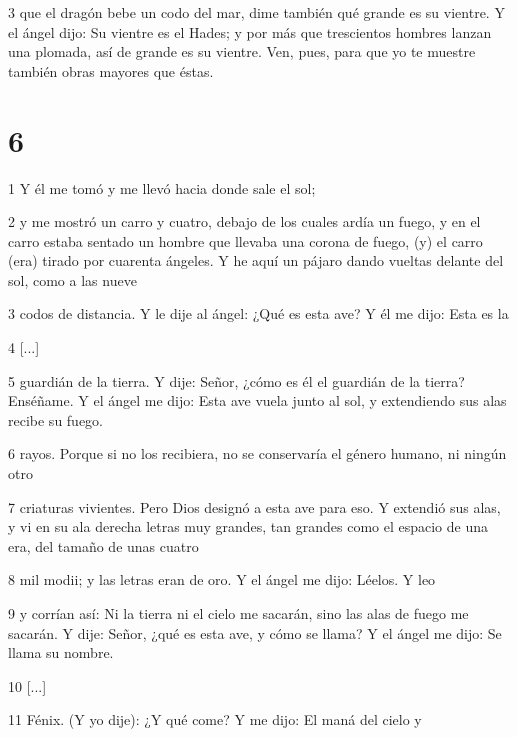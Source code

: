 \par 3 que el dragón bebe un codo del mar, dime también qué grande es su vientre. Y el ángel dijo: Su vientre es el Hades; y por más que trescientos hombres lanzan una plomada, así de grande es su vientre. Ven, pues, para que yo te muestre también obras mayores que éstas.

\chapter{6}

\par 1 Y él me tomó y me llevó hacia donde sale el sol;

\par 2 y me mostró un carro y cuatro, debajo de los cuales ardía un fuego, y en el carro estaba sentado un hombre que llevaba una corona de fuego, (y) el carro (era) tirado por cuarenta ángeles. Y he aquí un pájaro dando vueltas delante del sol, como a las nueve

\par 3 codos de distancia. Y le dije al ángel: ¿Qué es esta ave? Y él me dijo: Esta es la

\par 4 [...]

\par 5 guardián de la tierra. Y dije: Señor, ¿cómo es él el guardián de la tierra? Enséñame. Y el ángel me dijo: Esta ave vuela junto al sol, y extendiendo sus alas recibe su fuego.

\par 6 rayos. Porque si no los recibiera, no se conservaría el género humano, ni ningún otro

\par 7 criaturas vivientes. Pero Dios designó a esta ave para eso. Y extendió sus alas, y vi en su ala derecha letras muy grandes, tan grandes como el espacio de una era, del tamaño de unas cuatro

\par 8 mil modii; y las letras eran de oro. Y el ángel me dijo: Léelos. Y leo

\par 9 y corrían así: Ni la tierra ni el cielo me sacarán, sino las alas de fuego me sacarán. Y dije: Señor, ¿qué es esta ave, y cómo se llama? Y el ángel me dijo: Se llama su nombre.

\par 10 [...]

\par 11 Fénix. (Y yo dije): ¿Y qué come? Y me dijo: El maná del cielo y

